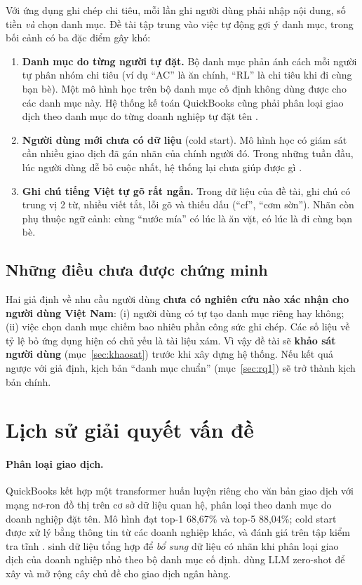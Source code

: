 \documentclass[12pt,a4paper]{article}
\begin{document}
Với ứng dụng ghi chép chi tiêu, mỗi lần ghi người dùng phải nhập nội dung, số tiền \emph{và} chọn danh mục. Đề tài tập trung vào việc tự động gợi ý danh mục, trong bối cảnh có ba đặc điểm gây khó:
\begin{enumerate}
  \item \textbf{Danh mục do từng người tự đặt.} Bộ danh mục phản ánh cách mỗi người tự phân nhóm chi tiêu (ví dụ ``AC'' là ăn chính, ``RL'' là chi tiêu khi đi cùng bạn bè). Một mô hình học trên bộ danh mục cố định không dùng được cho các danh mục này. Hệ thống kế toán QuickBooks cũng phải phân loại giao dịch theo danh mục do từng doanh nghiệp tự đặt tên \citep{dong2025quickbooks}.
  \item \textbf{Người dùng mới chưa có dữ liệu} (cold start). Mô hình học có giám sát cần nhiều giao dịch đã gán nhãn của chính người đó. Trong những tuần đầu, lúc người dùng dễ bỏ cuộc nhất, hệ thống lại chưa giúp được gì \citep{dong2025quickbooks}.
  \item \textbf{Ghi chú tiếng Việt tự gõ rất ngắn.} Trong dữ liệu của đề tài, ghi chú có trung vị 2 từ, nhiều viết tắt, lỗi gõ và thiếu dấu (``cf'', ``cơm sờn''). Nhãn còn phụ thuộc ngữ cảnh: cùng ``nước mía'' có lúc là ăn vặt, có lúc là đi cùng bạn bè.
\end{enumerate}

\subsection{Những điều chưa được chứng minh}
Hai giả định về nhu cầu người dùng \textbf{chưa có nghiên cứu nào xác nhận cho người dùng Việt Nam}: (i) người dùng có tự tạo danh mục riêng hay không; (ii) việc chọn danh mục chiếm bao nhiêu phần công sức ghi chép. Các số liệu về tỷ lệ bỏ ứng dụng hiện có chủ yếu là tài liệu xám. Vì vậy đề tài sẽ \textbf{khảo sát người dùng} (mục~\ref{sec:khaosat}) trước khi xây dựng hệ thống. Nếu kết quả ngược với giả định, kịch bản ``danh mục chuẩn'' (mục~\ref{sec:rq1}) sẽ trở thành kịch bản chính.

\section{Lịch sử giải quyết vấn đề}

\paragraph{Phân loại giao dịch.} QuickBooks kết hợp một transformer huấn luyện riêng cho văn bản giao dịch với mạng nơ-ron đồ thị trên cơ sở dữ liệu quan hệ, phân loại theo danh mục do doanh nghiệp đặt tên. Mô hình đạt top-1 68,67\% và top-5 88,04\%; cold start được xử lý bằng thông tin từ các doanh nghiệp khác, và đánh giá trên tập kiểm tra tĩnh \citep{dong2025quickbooks}. \citet{aluffi2025sme} sinh dữ liệu tổng hợp để \emph{bổ sung} dữ liệu có nhãn khi phân loại giao dịch của doanh nghiệp nhỏ theo bộ danh mục cố định. \citet{moraes2024taxonomy} dùng LLM zero-shot để xây và mở rộng cây chủ đề cho giao dịch ngân hàng.
\end{document}
